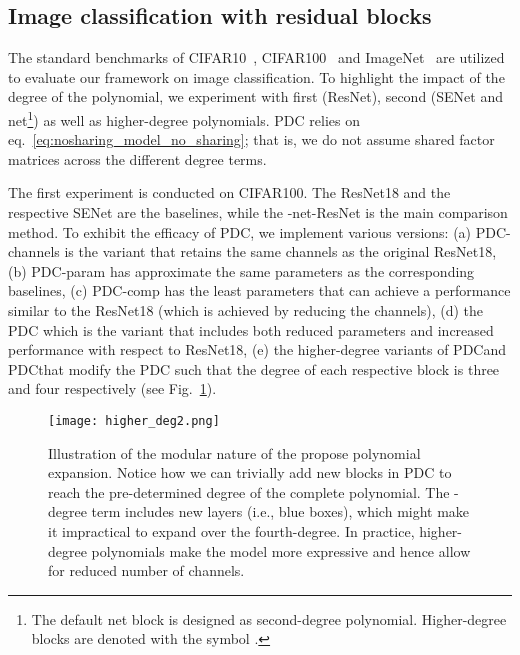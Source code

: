 \documentclass[runningheads]{llncs}
\newcommand{\resnet}{ResNet}
\newcommand{\modelres}{-net-\resnet}
\newcommand{\sne}{SENet}
\newcommand{\noshare}{PDC}
\providecommand\ie{i.e.,}
\providecommand{\citep}{\cite}
\begin{document}
\subsection{Image classification with residual blocks}
\label{ssec:nosharing_experiments_image_resnet}



The standard benchmarks of CIFAR10~\cite{krizhevsky2014cifar}, CIFAR100~\cite{CIFAR100} and ImageNet~\citep{russakovsky2015imagenet} are utilized to evaluate our framework on image classification. To highlight the impact of the degree of the polynomial, we experiment with first (\resnet), second (\sne{} and net\footnote{The default net block is designed as second-degree polynomial. Higher-degree blocks are denoted with the symbol .}) as well as higher-degree polynomials. \noshare{} relies on eq.~\ref{eq:nosharing_model_no_sharing}; that is, we do not assume shared factor matrices across the different degree terms. 




The first experiment is conducted on CIFAR100. The \resnet18 and the respective \sne{} are the baselines, while the \modelres{} is the main comparison method. To exhibit the efficacy of \noshare, we implement various versions: (a) \noshare-channels is the variant that retains the same channels as the original \resnet18, (b) \noshare-param has approximate the same parameters as the corresponding baselines, (c) \noshare-comp has the least parameters that can achieve a performance similar to the \resnet18 (which is achieved by reducing the channels), (d) the \noshare{} which is the variant that includes both reduced parameters and increased performance with respect to \resnet18, (e) the higher-degree variants of \noshare and \noshare  that modify the \noshare{} such that the degree of each respective block is three and four respectively (see Fig.~\ref{fig:nosharing_higher_order_block}). 

\begin{figure}[t!]
  \centering
    \texttt{[image: higher\_deg2.png]}
    \caption{Illustration of the modular nature of the propose polynomial expansion. Notice how we can trivially add new blocks in \noshare{} to reach the pre-determined degree of the complete polynomial. The -degree term includes  new layers (\ie{} blue boxes), which might make it impractical to expand over the fourth-degree. In practice, higher-degree polynomials make the model more expressive and hence allow for reduced number of channels.}

  \label{fig:nosharing_higher_order_block}
\end{figure}
\end{document}
